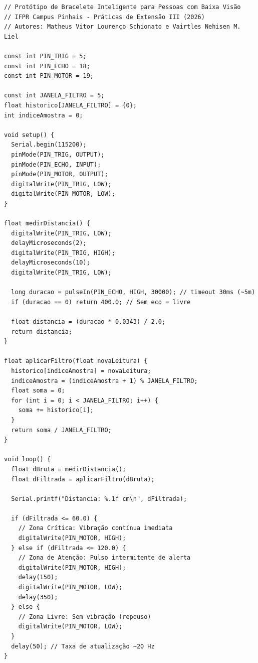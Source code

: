 \begin{verbatim}
// Protótipo de Bracelete Inteligente para Pessoas com Baixa Visão
// IFPR Campus Pinhais - Práticas de Extensão III (2026)
// Autores: Matheus Vitor Lourenço Schionato e Vairtles Nehisen M. Liel

const int PIN_TRIG = 5;
const int PIN_ECHO = 18;
const int PIN_MOTOR = 19;

const int JANELA_FILTRO = 5;
float historico[JANELA_FILTRO] = {0};
int indiceAmostra = 0;

void setup() {
  Serial.begin(115200);
  pinMode(PIN_TRIG, OUTPUT);
  pinMode(PIN_ECHO, INPUT);
  pinMode(PIN_MOTOR, OUTPUT);
  digitalWrite(PIN_TRIG, LOW);
  digitalWrite(PIN_MOTOR, LOW);
}

float medirDistancia() {
  digitalWrite(PIN_TRIG, LOW);
  delayMicroseconds(2);
  digitalWrite(PIN_TRIG, HIGH);
  delayMicroseconds(10);
  digitalWrite(PIN_TRIG, LOW);

  long duracao = pulseIn(PIN_ECHO, HIGH, 30000); // timeout 30ms (~5m)
  if (duracao == 0) return 400.0; // Sem eco = livre

  float distancia = (duracao * 0.0343) / 2.0;
  return distancia;
}

float aplicarFiltro(float novaLeitura) {
  historico[indiceAmostra] = novaLeitura;
  indiceAmostra = (indiceAmostra + 1) % JANELA_FILTRO;
  float soma = 0;
  for (int i = 0; i < JANELA_FILTRO; i++) {
    soma += historico[i];
  }
  return soma / JANELA_FILTRO;
}

void loop() {
  float dBruta = medirDistancia();
  float dFiltrada = aplicarFiltro(dBruta);

  Serial.printf("Distancia: %.1f cm\n", dFiltrada);

  if (dFiltrada <= 60.0) {
    // Zona Crítica: Vibração contínua imediata
    digitalWrite(PIN_MOTOR, HIGH);
  } else if (dFiltrada <= 120.0) {
    // Zona de Atenção: Pulso intermitente de alerta
    digitalWrite(PIN_MOTOR, HIGH);
    delay(150);
    digitalWrite(PIN_MOTOR, LOW);
    delay(350);
  } else {
    // Zona Livre: Sem vibração (repouso)
    digitalWrite(PIN_MOTOR, LOW);
  }
  delay(50); // Taxa de atualização ~20 Hz
}
\end{verbatim}